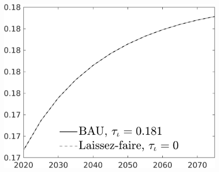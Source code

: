 \documentclass[12pt]{article}
\begin{document}
\begin{figure}[h!!]
\begin{minipage}[]{0.32\textwidth}
	\end{minipage}	
	\begin{minipage}[]{0.32\textwidth}
		\includegraphics[width=1\textwidth]{../../codding_model/own_basedOnFried/optimalPol_010922_revision/figures/all_13Sept22/CompTaul_LFBAU_Reg0_LgLf_spillover0_nsk1_xgr1_knspil0_sep1_countec0_GovRev0_etaa0.79_lgd1.png}
	\end{minipage}	
\end{figure}
\end{document}
